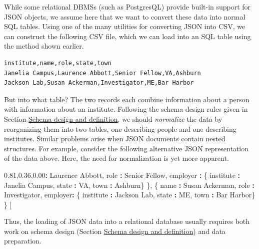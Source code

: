 \documentclass[]{krantz}
\newenvironment{Shaded}{\begin{snugshade}}{\end{snugshade}}
\newcommand{\StringTok}[1]{\textcolor[rgb]{0.31,0.60,0.02}{#1}}
\newcommand{\OperatorTok}[1]{\textcolor[rgb]{0.81,0.36,0.00}{\textbf{#1}}}
\newcommand{\NormalTok}[1]{#1}
\begin{document}
While some relational DBMSs (such as PostgresQL) provide built-in
support for JSON objects, we assume here that we want to convert these
data into normal SQL tables. Using one of the many utilities for
converting JSON into CSV, we can construct the following CSV file, which
we can load into an SQL table using the method shown earlier.

\begin{verbatim}
institute,name,role,state,town
Janelia Campus,Laurence Abbott,Senior Fellow,VA,Ashburn
Jackson Lab,Susan Ackerman,Investigator,ME,Bar Harbor
\end{verbatim}

But into what table? The two records each combine information about a
person with information about an institute. Following the schema design
rules given in Section \protect\hyperlink{sec:db:schema}{Schema design
and definition}, we should \emph{normalize} the data by reorganizing
them into two tables, one describing people and one describing
institutes. Similar problems arise when JSON documents contain nested
structures. For example, consider the following alternative JSON
representation of the data above. Here, the need for normalization is
yet more apparent.

\begin{Shaded}
\begin{Highlighting}[]
\NormalTok{[}
\NormalTok{  \{}
\NormalTok{    name }\OperatorTok{:}\StringTok{ }\NormalTok{Laurence Abbott,}
\NormalTok{    role }\OperatorTok{:}\StringTok{ }\NormalTok{Senior Fellow,}
\NormalTok{    employer }\OperatorTok{:}\StringTok{ }\NormalTok{\{ institute }\OperatorTok{:}\StringTok{ }\NormalTok{Janelia Campus,}
\NormalTok{                 state }\OperatorTok{:}\StringTok{ }\NormalTok{VA,}
\NormalTok{                 town }\OperatorTok{:}\StringTok{ }\NormalTok{Ashburn\}}
\NormalTok{  \},}
\NormalTok{  \{}
\NormalTok{    name }\OperatorTok{:}\StringTok{ }\NormalTok{Susan Ackerman,}
\NormalTok{    role }\OperatorTok{:}\StringTok{ }\NormalTok{Investigator,}
\NormalTok{    employer}\OperatorTok{:}\StringTok{ }\NormalTok{\{ institute }\OperatorTok{:}\StringTok{ }\NormalTok{Jackson Lab,}
\NormalTok{                state }\OperatorTok{:}\StringTok{ }\NormalTok{ME,}
\NormalTok{                town }\OperatorTok{:}\StringTok{ }\NormalTok{Bar Harbor\}}
\NormalTok{  \}}
\NormalTok{]}
\end{Highlighting}
\end{Shaded}

Thus, the loading of JSON data into a relational database usually
requires both work on schema design (Section
\protect\hyperlink{sec:db:schema}{Schema design and definition}) and
data preparation.
\end{document}
